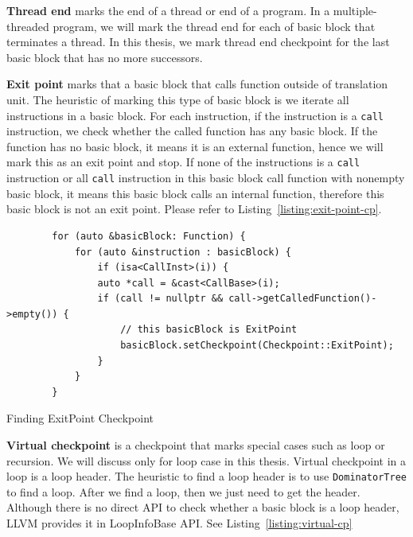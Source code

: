 \vspace{0.5cm}
\noindent \textbf{Thread end} marks the end of a thread or end of a program. In
a multiple-threaded program, we will mark the thread end for each of basic block
that terminates a thread. In this thesis, we mark thread end checkpoint for the
last basic block that has no more successors.

\vspace{0.5cm}
\noindent \textbf{Exit point} marks that a basic block that calls function
outside of translation unit. The heuristic of marking this type of basic block
is we iterate all instructions in a basic block. For each instruction, if the
instruction is a \texttt{call} instruction, we check whether the called function
has any basic block. If the function has no basic block, it means it is an
external function, hence we will mark this as an exit point and stop. If none of
the instructions is a \texttt{call} instruction or all \texttt{call} instruction
in this basic block call function with nonempty basic block, it means this basic
block calls an internal function, therefore this basic block is not an exit
point. Please refer to Listing~\ref{listing:exit-point-cp}.

\begin{listing}[htbp]
    \begin{verbatim}
        for (auto &basicBlock: Function) {
            for (auto &instruction : basicBlock) {
                if (isa<CallInst>(i)) {
                auto *call = &cast<CallBase>(i);
                if (call != nullptr && call->getCalledFunction()->empty()) {
                    // this basicBlock is ExitPoint
                    basicBlock.setCheckpoint(Checkpoint::ExitPoint);
                } 
            }
        } 
    \end{verbatim}
    \caption{Finding ExitPoint Checkpoint}    
    \label{listing:exit-point-cp}
\end{listing}

\vspace{0.5cm}
\noindent \textbf{Virtual checkpoint} is a checkpoint that marks special cases
such as loop or recursion. We will discuss only for loop case in this thesis.
Virtual checkpoint in a loop is a loop header. The heuristic to find a loop
header is to use \texttt{DominatorTree} to find a loop. After we find a loop,
then we just need to get the header. Although there is no direct API to check
whether a basic block is a loop header, LLVM provides it in LoopInfoBase API.
See Listing~\ref{listing:virtual-cp}

